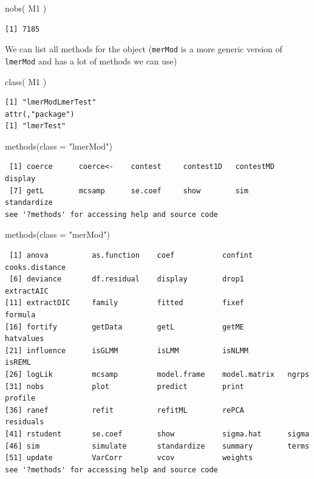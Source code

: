 \documentclass[
  letterpaper,
  DIV=11,
  numbers=noendperiod]{scrreprt}
\newenvironment{Shaded}{\begin{snugshade}}{\end{snugshade}}
\newcommand{\AttributeTok}[1]{\textcolor[rgb]{0.49,0.56,0.16}{#1}}
\newcommand{\FunctionTok}[1]{\textcolor[rgb]{0.02,0.16,0.49}{#1}}
\newcommand{\NormalTok}[1]{\textcolor[rgb]{0.00,0.44,0.13}{#1}}
\newcommand{\StringTok}[1]{\textcolor[rgb]{0.25,0.44,0.63}{#1}}
\begin{document}
\begin{Shaded}
\begin{Highlighting}[]
\FunctionTok{nobs}\NormalTok{( M1 )}
\end{Highlighting}
\end{Shaded}

\begin{verbatim}
[1] 7185
\end{verbatim}

We can list all methods for the object (\texttt{merMod} is a more
generic version of \texttt{lmerMod} and has a lot of methods we can use)

\begin{Shaded}
\begin{Highlighting}[]
\FunctionTok{class}\NormalTok{( M1 )}
\end{Highlighting}
\end{Shaded}

\begin{verbatim}
[1] "lmerModLmerTest"
attr(,"package")
[1] "lmerTest"
\end{verbatim}

\begin{Shaded}
\begin{Highlighting}[]
\FunctionTok{methods}\NormalTok{(}\AttributeTok{class =} \StringTok{"lmerMod"}\NormalTok{)}
\end{Highlighting}
\end{Shaded}

\begin{verbatim}
 [1] coerce      coerce<-    contest     contest1D   contestMD   display    
 [7] getL        mcsamp      se.coef     show        sim         standardize
see '?methods' for accessing help and source code
\end{verbatim}

\begin{Shaded}
\begin{Highlighting}[]
\FunctionTok{methods}\NormalTok{(}\AttributeTok{class =} \StringTok{"merMod"}\NormalTok{)}
\end{Highlighting}
\end{Shaded}

\begin{verbatim}
 [1] anova          as.function    coef           confint        cooks.distance
 [6] deviance       df.residual    display        drop1          extractAIC    
[11] extractDIC     family         fitted         fixef          formula       
[16] fortify        getData        getL           getME          hatvalues     
[21] influence      isGLMM         isLMM          isNLMM         isREML        
[26] logLik         mcsamp         model.frame    model.matrix   ngrps         
[31] nobs           plot           predict        print          profile       
[36] ranef          refit          refitML        rePCA          residuals     
[41] rstudent       se.coef        show           sigma.hat      sigma         
[46] sim            simulate       standardize    summary        terms         
[51] update         VarCorr        vcov           weights       
see '?methods' for accessing help and source code
\end{verbatim}
\end{document}
